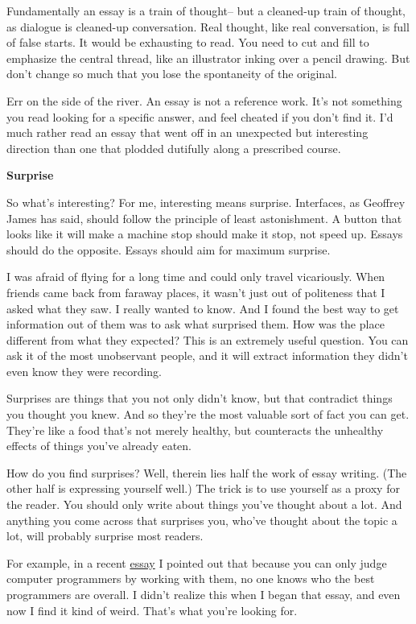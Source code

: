 \documentclass[12pt]{book}
\begin{document}
Fundamentally an essay is a train of thought-- but a cleaned-up train of
thought, as dialogue is cleaned-up conversation. Real thought, like real
conversation, is full of false starts. It would be exhausting to read.
You need to cut and fill to emphasize the central thread, like an
illustrator inking over a pencil drawing. But don't change so much that
you lose the spontaneity of the original.

Err on the side of the river. An essay is not a reference work. It's not
something you read looking for a specific answer, and feel cheated if
you don't find it. I'd much rather read an essay that went off in an
unexpected but interesting direction than one that plodded dutifully
along a prescribed course.

\textbf{Surprise}

So what's interesting? For me, interesting means surprise. Interfaces,
as Geoffrey James has said, should follow the principle of least
astonishment. A button that looks like it will make a machine stop
should make it stop, not speed up. Essays should do the opposite. Essays
should aim for maximum surprise.

I was afraid of flying for a long time and could only travel
vicariously. When friends came back from faraway places, it wasn't just
out of politeness that I asked what they saw. I really wanted to know.
And I found the best way to get information out of them was to ask what
surprised them. How was the place different from what they expected?
This is an extremely useful question. You can ask it of the most
unobservant people, and it will extract information they didn't even
know they were recording.

Surprises are things that you not only didn't know, but that contradict
things you thought you knew. And so they're the most valuable sort of
fact you can get. They're like a food that's not merely healthy, but
counteracts the unhealthy effects of things you've already eaten.

How do you find surprises? Well, therein lies half the work of essay
writing. (The other half is expressing yourself well.) The trick is to
use yourself as a proxy for the reader. You should only write about
things you've thought about a lot. And anything you come across that
surprises you, who've thought about the topic a lot, will probably
surprise most readers.

For example, in a recent \href{gh.html}{essay} I pointed out that
because you can only judge computer programmers by working with them, no
one knows who the best programmers are overall. I didn't realize this
when I began that essay, and even now I find it kind of weird. That's
what you're looking for.
\end{document}
